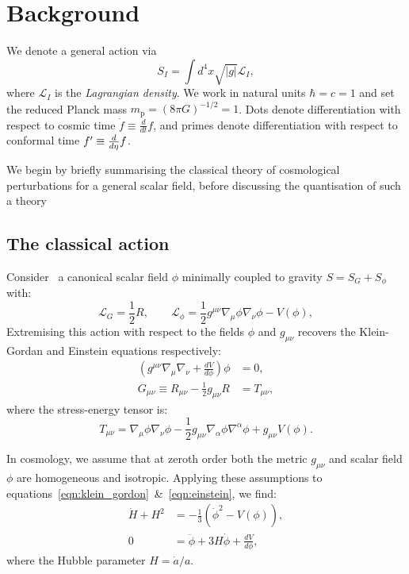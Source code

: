\section{Background}
\label{sec:background}

\clearpage{}

We denote a general action via
\begin{equation}
  S_I = \int d^4x\sqrt{|g|}\mathcal{L}_I,
  \label{eqn:general_action}
\end{equation}
where $\mathcal{L}_I$ is the {\em Lagrangian density}. We work in natural units $\hbar=c=1$ and set the reduced Planck mass $m_\mathrm{p} = {(8\pi G)}^{-1/2} = 1$. Dots denote differentiation with respect to cosmic time $\dot{f}\equiv \frac{d}{dt}f$, and primes denote differentiation with respect to conformal time ${{f}^\prime}\equiv\frac{d}{d\eta}f$.

We begin by briefly summarising the classical theory of cosmological perturbations for a general scalar field, before discussing the quantisation of such a theory


\subsection{The classical action}
\label{sec:inflation}
Consider~\cite{Baumann+2009} a canonical scalar field $\phi$ minimally coupled to gravity $S= S_G + S_\phi$ with:
\begin{equation}
  \mathcal{L}_G = \frac{1}{2}R, 
  \qquad
  \mathcal{L}_\phi = \frac{1}{2}g^{\mu\nu}\nabla_\mu\phi\nabla_\nu\phi - V(\phi),
  \label{eqn:action}
\end{equation}
Extremising this action with respect to the fields $\phi$ and $g_{\mu\nu}$ recovers the Klein-Gordan and Einstein equations respectively:
\begin{align}
  \left( g^{\mu\nu}\nabla_\mu\nabla_\nu + \frac{dV}{d\phi} \right) \phi &= 0,
  \label{eqn:klein_gordon}\\
  G_{\mu\nu}\equiv R_{\mu\nu}-\frac{1}{2}g_{\mu\nu}R&= T_{\mu\nu},
  \label{eqn:einstein}
\end{align}
where the stress-energy tensor is:
\begin{equation}
  T_{\mu\nu} = \nabla_\mu\phi \nabla_\nu\phi - \frac{1}{2}g_{\mu\nu} \nabla_\alpha\phi \nabla^\alpha\phi +g_{\mu\nu} V(\phi).
  \label{eqn:SET}
\end{equation}

In cosmology, we assume that at zeroth order both the metric $g_{\mu\nu}$ and scalar field $\phi$ are homogeneous and isotropic. Applying these assumptions to equations~\eqref{eqn:klein_gordon}~\&~\eqref{eqn:einstein}, we find:
\begin{align}
  \dot{H}+H^2 &= -\frac{1}{3}\left( \dot{\phi}^2 - V(\phi) \right),
  \label{eqn:Raychaudhuri}\\
  0&=\ddot{\phi} + 3H\dot{\phi} + \frac{dV}{d\phi},
\end{align}
where the Hubble parameter $H = \dot{a}/a$.
